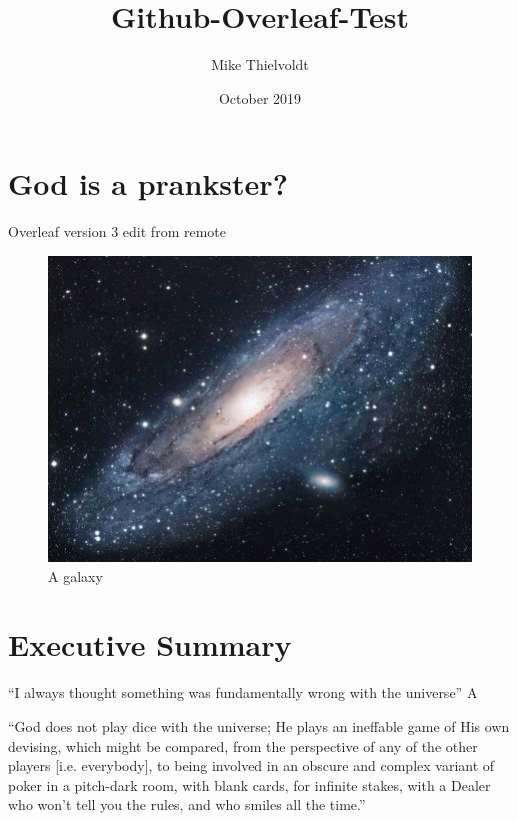 \documentclass{article}
\title{Github-Overleaf-Test}
\author{Mike Thielvoldt}
\date{October 2019}
\begin{document}
\maketitle

\section{God is a prankster?}

Overleaf version 3 edit from remote

\begin{figure}[h!]
\centering
\includegraphics[scale=1.7]{universe}
\caption{A galaxy}
\label{fig:universe}
\end{figure}


\section{Executive Summary}
``I always thought something was fundamentally wrong with the universe'' \citep{adams1995hitchhiker}
A 

``God does not play dice with the universe; He plays an ineffable game of His own devising, which might be compared, from the perspective of any of the other players [i.e. everybody], to being involved in an obscure and complex variant of poker in a pitch-dark room, with blank cards, for infinite stakes, with a Dealer who won't tell you the rules, and who smiles all the time.'' \citep{pratchett1990goodomens}



\end{document}
